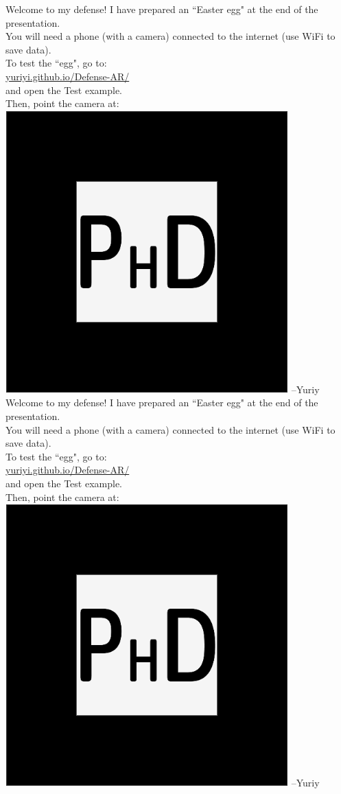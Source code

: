\documentclass[a4paper,12pt]{letter}
\begin{document}
\Large\thispagestyle{empty}
\centering
Welcome to my defense!
\vskip1cm
I have prepared an ``Easter egg" at the end of the presentation.\\[1em]
You will need a phone (with a camera) connected to the internet (use WiFi to save data).\\[1em]
To test the ``egg", go to:\\
\url{yuriyi.github.io/Defense-AR/}\\
and open the Test example.\\[1em]
Then, point the camera at:
\includegraphics[width=.9\textwidth]{../source/images/phd}
\flushright --Yuriy
\newpage
\Large\thispagestyle{empty}
\centering
Welcome to my defense!
\vskip1cm
I have prepared an ``Easter egg" at the end of the presentation.\\[1em]
You will need a phone (with a camera) connected to the internet (use WiFi to save data).\\[1em]
To test the ``egg", go to:\\
\url{yuriyi.github.io/Defense-AR/}\\
and open the Test example.\\[1em]
Then, point the camera at:
\includegraphics[width=.9\textwidth]{../source/images/phd}
\flushright --Yuriy
\end{document}
